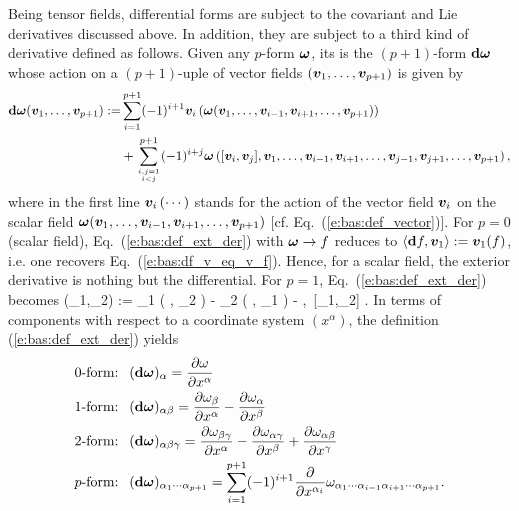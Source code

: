 Being tensor fields, differential forms are subject to the covariant
and Lie derivatives discussed above. In addition, they are subject to a third kind
of derivative defined as follows.  Given any $p$-form $\bm{\omega}$,
its 
is the $(p+1)$-form $\mathbf{d}\bm{\omega}$
whose action on a $(p+1)$-uple of vector fields $(\bm{v}_1,\ldots,\bm{v}_{p+1})$
is given by
\begin{align}
\mathbf{d}\bm{\omega}(\bm{v}_1,\ldots,\bm{v}_{p+1}) := & \sum_{i=1}^{p+1} (-1)^{i+1}
    \bm{v}_i\left(\bm{\omega}(\bm{v}_1,\ldots,\bm{v}_{i-1},\bm{v}_{i+1},\ldots,\bm{v}_{p+1})\right) \nonumber \\
    & + \sum_{i,j=1\atop i < j}^{p+1}
    (-1)^{i+j} \bm{\omega}\left([\bm{v}_i,\bm{v}_j],\bm{v}_1,\ldots,\bm{v}_{i-1},\bm{v}_{i+1},
        \ldots,\bm{v}_{j-1},\bm{v}_{j+1},\ldots,\bm{v}_{p+1}\right) , \label{e:bas:def_ext_der}
\end{align}
where in the first line $\bm{v}_i\left(\cdots\right)$ stands for the action of the vector field
$\bm{v}_i$ on the scalar field $\bm{\omega}(\bm{v}_1,\ldots,\bm{v}_{i-1},\bm{v}_{i+1},\ldots,\bm{v}_{p+1})$
[cf. Eq.~(\ref{e:bas:def_vector})].
For $p=0$ (scalar field), Eq.~(\ref{e:bas:def_ext_der}) with $\bm{\omega}\to f$  reduces
to $\langle \mathbf{d} f, \bm{v}_1 \rangle := \bm{v}_1(f)$, i.e. one recovers Eq.~(\ref{e:bas:df_v_eq_v_f}). Hence, for a
scalar field, the exterior derivative is nothing but the differential. For $p=1$, Eq.~(\ref{e:bas:def_ext_der})
becomes
\be \label{e:bas:def_ext_der_p1}
    \dd\w{\omega}(_1,_2) := _1 \left( \langle \w{\omega}, _2 \rangle \right)
        - _2 \left( \langle \w{\omega}, _1 \rangle \right)
        - \left\langle \w{\omega},\, [_1,_2] \right\rangle .
\ee
In terms of components with respect to a coordinate system $(x^\alpha)$,
the definition (\ref{e:bas:def_ext_der}) yields
\begin{subequations}
\label{e:bas:def_der_ext_comp}
\begin{align}
    \mbox{0-form: \ }  & (\mathbf{d}\bm{\omega})_\alpha =
        \frac{\partial \omega}{\partial x^\alpha} \label{e:bas:def_ext_0f} \\
    \mbox{1-form: \ }  & (\mathbf{d}\bm{\omega})_{\alpha\beta} =
    \frac{\partial \omega_\beta}{\partial x^\alpha} - \frac{\partial \omega_\alpha}{\partial x^\beta}
             \label{e:bas:def_ext_1f} \\
    \mbox{2-form: \ }  & (\mathbf{d}\bm{\omega})_{\alpha\beta\gamma} =
    \frac{\partial \omega_{\beta\gamma}}{\partial x^\alpha} -
    \frac{\partial \omega_{\alpha\gamma}}{\partial x^\beta} +
    \frac{\partial \omega_{\alpha\beta}}{\partial x^\gamma} \label{e:bas:def_ext_2f} \\
     \mbox{$p$-form: \ }  &
     (\mathbf{d}\bm{\omega})_{\alpha_1\cdots\alpha_{p+1}} =
     \sum_{i=1}^{p+1} (-1)^{i+1} \frac{\partial }{\partial x^{\alpha_i}}
     \omega_{\alpha_1\cdots\alpha_{i-1}\alpha_{i+1}\cdots\alpha_{p+1}} .
\end{align}
\end{subequations}

